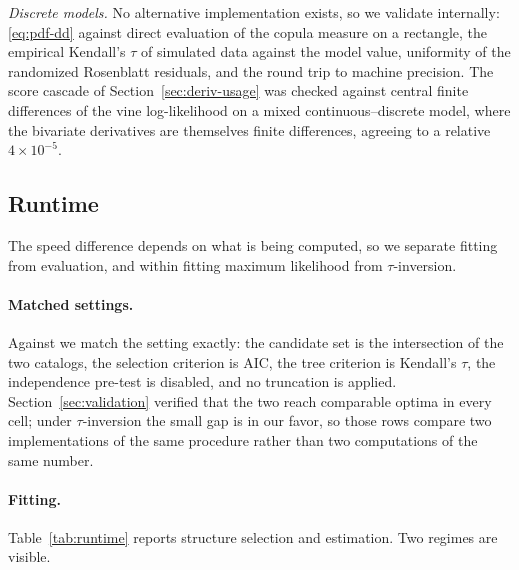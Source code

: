 \documentclass[article]{jss}
\begin{document}
\emph{Discrete models.}  No alternative implementation exists, so we validate
internally: \eqref{eq:pdf-dd} against direct evaluation of the copula measure
on a rectangle, the empirical Kendall's $\tau$ of simulated data against the
model value, uniformity of the randomized Rosenblatt residuals, and the round
trip  to machine precision.  The
score cascade of Section~\ref{sec:deriv-usage} was checked against central
finite differences of the vine log-likelihood on a mixed continuous--discrete
model, where the bivariate derivatives are themselves finite differences,
agreeing to a relative $4 \times 10^{-5}$.

\subsection{Runtime}\label{sec:runtime}

The speed difference depends on what is being computed, so we separate
fitting from evaluation, and within fitting maximum likelihood from
$\tau$-inversion.

\paragraph{Matched settings.}  Against  we match the setting
exactly: the candidate set is the intersection of the two catalogs, the
selection criterion is AIC, the tree criterion is Kendall's $\tau$, the
independence pre-test is disabled, and no truncation is applied.
Section~\ref{sec:validation} verified that the two reach comparable optima in
every cell; under $\tau$-inversion the small gap is in our favor, so those
rows compare two implementations of the same procedure rather than two
computations of the same number.

\paragraph{Fitting.}  Table~\ref{tab:runtime} reports structure selection and
estimation.  Two regimes are visible.
\end{document}
